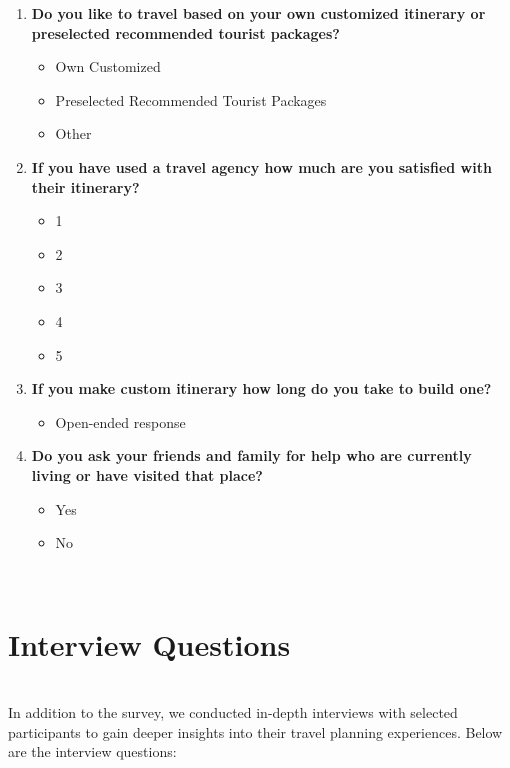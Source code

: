 \documentclass[conference]{IEEEtran}
\begin{document}
\begin{enumerate}
        \item \textbf{Do you like to travel based on your own customized itinerary or preselected recommended tourist packages?}
        \begin{itemize}
            \item Own Customized
            \item Preselected Recommended Tourist Packages
            \item Other
        \end{itemize}

        \item \textbf{If you have used a travel agency how much are you satisfied with their itinerary?}
        \begin{itemize}
            \item 1
            \item 2
            \item 3
            \item 4
            \item 5
        \end{itemize}

        \item \textbf{If you make custom itinerary how long do you take to build one?}
        \begin{itemize}
            \item Open-ended response
        \end{itemize}

        \item \textbf{Do you ask your friends and family for help who are currently living or have visited that place?}
        \begin{itemize}
            \item Yes
            \item No
        \end{itemize}
    \end{enumerate}
    \\

\newpage

\section{Interview Questions}
\\
    In addition to the survey, we conducted in-depth interviews with selected participants to gain deeper insights into their travel planning experiences. Below are the interview questions:
    \\
\end{document}
